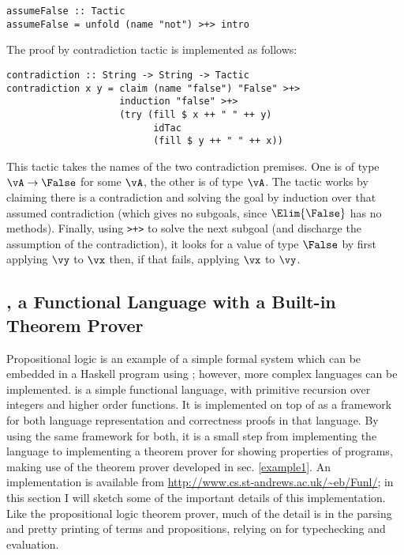 \begin{verbatim}
assumeFalse :: Tactic
assumeFalse = unfold (name "not") >+> intro
\end{verbatim}

The proof by contradiction tactic
is implemented as follows:
\\

\begin{verbatim}
contradiction :: String -> String -> Tactic
contradiction x y = claim (name "false") "False" >+>
                    induction "false" >+>
                    (try (fill $ x ++ " " ++ y)
                          idTac
                          (fill $ y ++ " " ++ x))
\end{verbatim}

This tactic takes the names of the two contradiction premises. One is
of type $\vA\to\False$ for some $\vA$, the other is of type $\vA$. The
tactic works by claiming there is a contradiction and solving the goal
by induction over that assumed contradiction (which gives no subgoals,
since $\Elim{\False}$ has no methods). Finally, using \texttt{>+>} to
solve the next subgoal (and discharge the assumption of the
contradiction), it looks for a value of type $\False$ by first
applying $\vy$ to $\vx$ then, if that fails, applying $\vx$ to $\vy$.

\subsection{\Funl{}, a Functional Language with a Built-in Theorem Prover}

\label{example2}

Propositional logic is an example of a simple formal system which can
be embedded in a Haskell program using \Ivor{}; however, more complex
languages can be implemented. \Funl{} is a simple functional language,
with primitive recursion over integers and higher order functions. It
is implemented on top of \Ivor{} as a framework for both language
representation and correctness proofs in that language. By using the
same framework for both, it is a small step from implementing the
language to implementing a theorem prover for showing properties of
programs, making use of the theorem prover developed
in sec. \ref{example1}.
An implementation is available from
\url{http://www.cs.st-andrews.ac.uk/~eb/Funl/}; in this section I will
sketch some of the important details of this implementation. Like the
propositional logic theorem prover, much of the detail is in the
parsing and pretty printing of terms and propositions, relying on
\Ivor{} for typechecking and evaluation.

